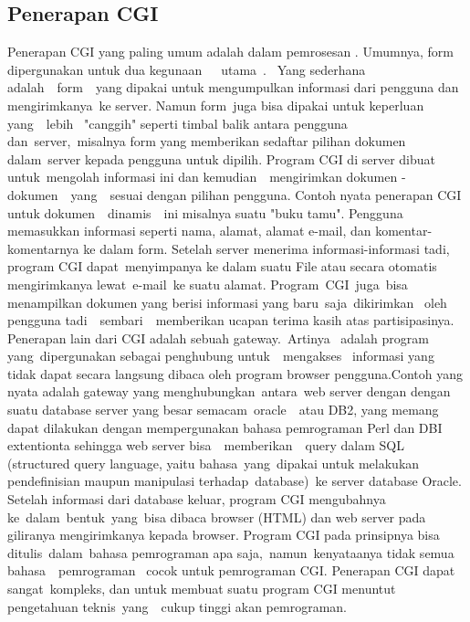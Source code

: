 \begin{enumerate}
\subsection{Penerapan CGI}
Penerapan CGI yang paling umum adalah dalam pemrosesan . Umumnya, form dipergunakan untuk dua kegunaan~~~utama~.~ Yang  sederhana  adalah~~form~~yang  dipakai  untuk mengumpulkan informasi dari pengguna dan mengirimkanya~ke server. Namun  form~juga bisa dipakai untuk keperluan  yang~~lebih~ "canggih"  seperti timbal balik antara pengguna dan~server,~misalnya  form  yang memberikan sedaftar pilihan dokumen dalam~server kepada pengguna  untuk dipilih. Program CGI di server dibuat untuk~mengolah informasi ini  dan kemudian~~mengirimkan  dokumen - dokumen~~yang~~sesuai  dengan  pilihan pengguna.
Contoh nyata penerapan CGI untuk dokumen~~dinamis~~ini  misalnya  suatu "buku tamu". Pengguna memasukkan informasi seperti nama, alamat, alamat e-mail, dan komentar-komentarnya ke dalam form. Setelah server menerima informasi-informasi tadi, program CGI dapat~menyimpanya ke dalam  suatu File atau secara otomatis mengirimkanya lewat~e-mail~ke  suatu  alamat. Program~CGI~juga~bisa menampilkan dokumen yang  berisi  informasi  yang
baru~saja~dikirimkan~ oleh  pengguna  tadi~~sembari~~memberikan  ucapan  terima kasih atas partisipasinya.
Penerapan lain dari CGI adalah sebuah gateway.~Artinya~ adalah  program yang~dipergunakan sebagai penghubung  untuk~~mengakses~ informasi  yang tidak dapat secara langsung dibaca oleh program browser pengguna.Contoh yang nyata adalah gateway yang menghubungkan~antara~web  server  dengan dengan suatu database server yang besar semacam~oracle~~atau  DB2, yang  memang dapat dilakukan dengan mempergunakan bahasa pemrograman Perl dan DBI extentionta sehingga web server bisa~~memberikan~~query  dalam  SQL (structured query language, yaitu bahasa~yang~dipakai  untuk  melakukan pendefinisian maupun manipulasi terhadap~database)~ke  server  database Oracle. Setelah informasi dari database keluar, program CGI mengubahnya ke~dalam~bentuk~yang~bisa dibaca browser (HTML)  dan  web  server  pada giliranya mengirimkanya kepada browser.
Program CGI pada prinsipnya bisa ditulis~dalam~bahasa  pemrograman  apa saja,~namun~kenyataanya tidak  semua  bahasa~~pemrograman~ cocok  untuk pemrograman CGI. Penerapan CGI dapat sangat~kompleks, dan untuk membuat  suatu program CGI menuntut pengetahuan teknis~yang~~cukup  tinggi  akan pemrograman. \par

\end{enumerate}
